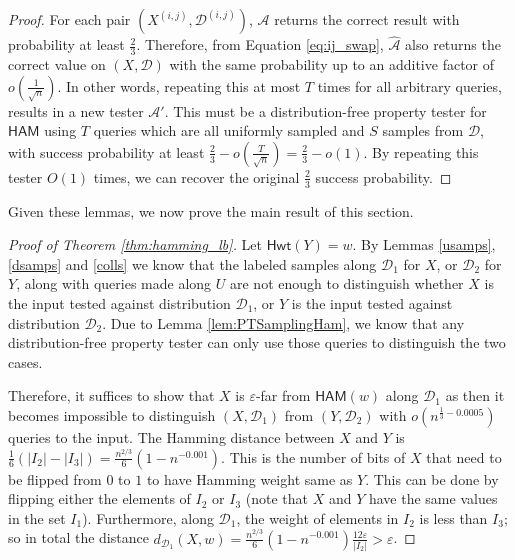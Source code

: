 \documentclass[10pt,a4paper]{article}
\newcommand{\Hamming}{\mathsf{Hwt}}
\newcommand{\HAM}{\mathsf{HAM}}
\newcommand{\sD}{\mathcal{D}}
\newcommand{\sA}{\mathcal{A}}
\begin{document}
\begin{proof}
For each pair $(X^{(i,j)},\mathcal{D}^{(i,j)})$, $\mathcal{A}$ returns the correct result with probability at least $\frac{2}{3}$. Therefore, from Equation \ref{eq:ij_swap}, $\hat{\sA}$ also returns the correct value on $(X,\mathcal{D})$ with the same probability up to an additive factor of $o\left(\frac{1}{\sqrt{n}}\right)$. In other words, repeating this at most $T$ times for all arbitrary queries, results in a new tester $\sA'$. This must be a distribution-free property tester for $\HAM$ using $T$ queries which are all uniformly sampled and $S$ samples from $\sD$, with success probability at least $\frac{2}{3}-o\left(\frac{T}{\sqrt{n}}\right)=\frac{2}{3}-o(1)$. By repeating this tester $O(1)$ times, we can recover the original $\frac{2}{3}$ success probability.
\end{proof}

\noindent Given these lemmas, we now prove the main result of this section.
\begin{proof}[Proof of Theorem \ref{thm:hamming_lb}]
Let $\Hamming(Y) = w$. By Lemmas \ref{usamps}, \ref{dsamps} and \ref{colls} we know that the labeled samples along $\sD_{1}$ for $X$, or $\sD_{2}$ for $Y$, along with queries made along $U$ are not enough to distinguish whether $X$ is the input tested against distribution $\mathcal{D}_{1}$, or $Y$ is the input tested against distribution $\mathcal{D}_{2}$. Due to Lemma \ref{lem:PTSamplingHam}, we know that any distribution-free property tester can only use those queries to distinguish the two cases. 

Therefore, it suffices to show that $X$ is $\varepsilon$-far from $\HAM(w)$ along $\mathcal{D}_{1}$ as then it becomes impossible to distinguish $(X, \mathcal{D}_{1})$ from $(Y, \mathcal{D}_{2})$ with $o(n^{\frac{1}{3}-0.0005})$ queries to the input. The Hamming distance between $X$ and $Y$ is $\frac{1}{6}(|I_{2}|-|I_{3}|)=\frac{n^{2/3}}{6}(1-n^{-0.001})$. This is the number of bits of $X$ that need to be flipped from $0$ to $1$ to have Hamming weight same as $Y$. This can be done by flipping either the elements of $I_{2}$ or $I_{3}$ (note that $X$ and $Y$ have the same values in the set $I_{1}$). Furthermore, along $\sD_{1}$, the weight of elements in $I_{2}$ is less than $I_{3}$; so in total the distance $d_{\sD_{1}}(X, w)=\frac{n^{2/3}}{6}(1-n^{-0.001}) \frac{12\varepsilon}{|I_{2}|}>\varepsilon$.
\end{proof}
\end{document}
